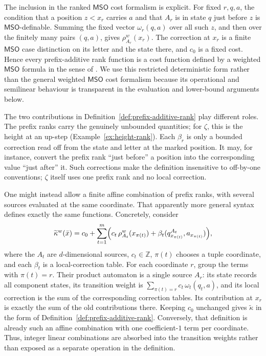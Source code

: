 \documentclass[11pt]{article}
\theoremstyle{definition}
\newcommand{\Z}{\mathbb Z}
\newcommand{\MSO}{\mathsf{MSO}}
\begin{document}
The inclusion in the ranked $\MSO$ cost formalism is explicit.  For fixed
$r,q,a$, the condition that a position $z<x_r$ carries $a$ and that $A_r$ is
in state $q$ just before $z$ is $\MSO$-definable.  Summing the fixed vector
$\omega_r(q,a)$ over all such $z$, and then over the finitely many pairs
$(q,a)$, gives $\rho_{A_r}^w(x_r)$.  The correction at $x_r$ is a finite
$\MSO$ case distinction on its letter and the state there, and $c_0$ is a
fixed cost.  Hence every
prefix-additive rank function is a cost function defined by a weighted $\MSO$
formula in the sense of
\cite{BourhisEtAl2021}.  We use this restricted deterministic form rather
than the general weighted $\MSO$ cost formalism because its operational and
semilinear behaviour is transparent in the evaluation and lower-bound
arguments below.

The two contributions in Definition~\ref{def:prefix-additive-rank} play
different roles.  The prefix ranks carry the genuinely unbounded quantities;
for $\zeta$, this is the height at an up-step
(Example~\ref{ex:height-rank}).  Each $\beta_r$ is only a bounded correction
read off from the state and letter at the marked position.  It may, for
instance, convert the prefix rank ``just before'' a position into the
corresponding value ``just after'' it.  Such corrections make the definition
insensitive to off-by-one conventions; $\zeta$ itself uses one prefix rank and
no local correction.

One might instead allow a finite affine combination of prefix ranks, with
several sources evaluated at the same coordinate.  That apparently more
general syntax defines exactly the same functions.  Concretely, consider
\[
   \widetilde\kappa^w(\bar x)
   =c_0+\sum_{t=1}^{m}
      \Bigl(c_t\,\rho_{A_t}^w(x_{\pi(t)})
            +\beta_t(q^{A_t}_{x_{\pi(t)}},a_{x_{\pi(t)}})\Bigr),
\]
where the $A_t$ are $d$-dimensional sources, $c_t\in\Z$, $\pi(t)$ chooses a
tuple coordinate, and each $\beta_t$ is a local-correction table.  For each
coordinate $r$, group the terms with $\pi(t)=r$.  Their product automaton is a
single source $A_r$: its state records all component states, its transition
weight is $\sum_{\pi(t)=r}c_t\,\omega_t(q_t,a)$, and its local correction is
the sum of the corresponding correction tables.
Its contribution at $x_r$ is exactly the sum of the old contributions there.
Keeping $c_0$ unchanged gives $\widetilde\kappa$ in the form of
Definition~\ref{def:prefix-additive-rank}.  Conversely, that definition is
already such an affine combination with one coefficient-$1$ term per
coordinate.  Thus, integer linear combinations are absorbed into the
transition weights rather than exposed as a separate operation in the
definition.
\end{document}
